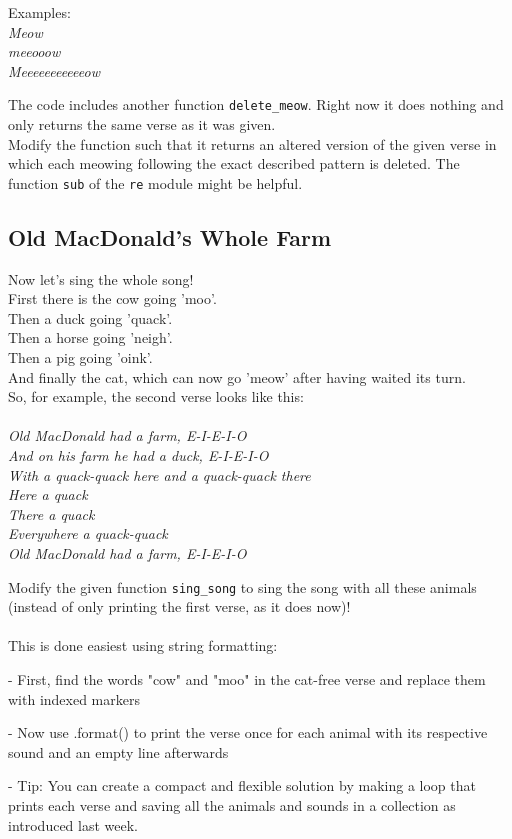 \noindent Examples:\\
\textit{Meow\\
meeooow\\
Meeeeeeeeeeeow\\}

\noindent The code includes another function  \texttt{delete\_meow}. Right now it does nothing and only returns the same verse as it was given.\\
Modify the function such that it returns an altered version of the given verse in which each meowing following the exact described pattern is deleted. The function \texttt{sub} of the \texttt{re} module might be helpful.

\cprotect{}

\subsection{Old MacDonald's Whole Farm}
Now let's sing the whole song!\\
First there is the cow going 'moo'.\\
Then a duck going 'quack'.\\
Then a horse going 'neigh'.\\
Then a pig going 'oink'.\\
And finally the cat, which can now go 'meow' after having waited its turn.\\
So, for example, the second verse looks like this:\\\\
\textit{
Old MacDonald had a farm, E-I-E-I-O\\
And on his farm he had a duck, E-I-E-I-O\\
With a quack-quack here and a quack-quack there\\
Here a quack\\
There a quack\\
Everywhere a quack-quack\\
Old MacDonald had a farm, E-I-E-I-O\\
}

\noindent Modify the given function  \texttt{sing\_song} to sing the song with all these animals (instead of only printing the first verse, as it does now)!\\\\
This is done easiest using string formatting:\\
\begin{description}
  \item - First, find the words "cow" and "moo" in the cat-free verse and replace them with indexed markers
  \item - Now use .format() to print the verse once for each animal with its respective sound and an empty line afterwards
  \item - Tip: You can create a compact and flexible solution by making a loop that prints each verse and saving all the animals and sounds in a collection as introduced last week.
\end{description}

